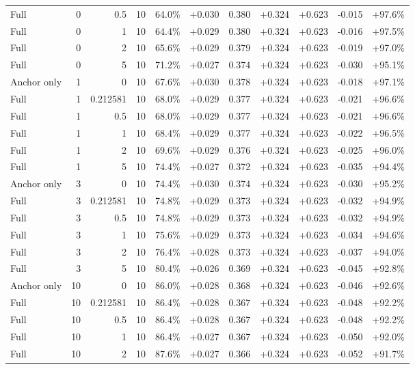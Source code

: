 \begin{table}[htbp]
\begin{tabular}{lrrrccccccc}
Full & 0 & 0.5 & 10 & 64.0\% & +0.030 & 0.380 & +0.324 & +0.623 & -0.015 & +97.6\% \\
Full & 0 & 1 & 10 & 64.4\% & +0.029 & 0.380 & +0.324 & +0.623 & -0.016 & +97.5\% \\
Full & 0 & 2 & 10 & 65.6\% & +0.029 & 0.379 & +0.324 & +0.623 & -0.019 & +97.0\% \\
Full & 0 & 5 & 10 & 71.2\% & +0.027 & 0.374 & +0.324 & +0.623 & -0.030 & +95.1\% \\
Anchor only & 1 & 0 & 10 & 67.6\% & +0.030 & 0.378 & +0.324 & +0.623 & -0.018 & +97.1\% \\
Full & 1 & 0.212581 & 10 & 68.0\% & +0.029 & 0.377 & +0.324 & +0.623 & -0.021 & +96.6\% \\
Full & 1 & 0.5 & 10 & 68.0\% & +0.029 & 0.377 & +0.324 & +0.623 & -0.021 & +96.6\% \\
Full & 1 & 1 & 10 & 68.4\% & +0.029 & 0.377 & +0.324 & +0.623 & -0.022 & +96.5\% \\
Full & 1 & 2 & 10 & 69.6\% & +0.029 & 0.376 & +0.324 & +0.623 & -0.025 & +96.0\% \\
Full & 1 & 5 & 10 & 74.4\% & +0.027 & 0.372 & +0.324 & +0.623 & -0.035 & +94.4\% \\
Anchor only & 3 & 0 & 10 & 74.4\% & +0.030 & 0.374 & +0.324 & +0.623 & -0.030 & +95.2\% \\
Full & 3 & 0.212581 & 10 & 74.8\% & +0.029 & 0.373 & +0.324 & +0.623 & -0.032 & +94.9\% \\
Full & 3 & 0.5 & 10 & 74.8\% & +0.029 & 0.373 & +0.324 & +0.623 & -0.032 & +94.9\% \\
Full & 3 & 1 & 10 & 75.6\% & +0.029 & 0.373 & +0.324 & +0.623 & -0.034 & +94.6\% \\
Full & 3 & 2 & 10 & 76.4\% & +0.028 & 0.373 & +0.324 & +0.623 & -0.037 & +94.0\% \\
Full & 3 & 5 & 10 & 80.4\% & +0.026 & 0.369 & +0.324 & +0.623 & -0.045 & +92.8\% \\
Anchor only & 10 & 0 & 10 & 86.0\% & +0.028 & 0.368 & +0.324 & +0.623 & -0.046 & +92.6\% \\
Full & 10 & 0.212581 & 10 & 86.4\% & +0.028 & 0.367 & +0.324 & +0.623 & -0.048 & +92.2\% \\
Full & 10 & 0.5 & 10 & 86.4\% & +0.028 & 0.367 & +0.324 & +0.623 & -0.048 & +92.2\% \\
Full & 10 & 1 & 10 & 86.4\% & +0.027 & 0.367 & +0.324 & +0.623 & -0.050 & +92.0\% \\
Full & 10 & 2 & 10 & 87.6\% & +0.027 & 0.366 & +0.324 & +0.623 & -0.052 & +91.7\% \\

\end{tabular}
\end{table}
